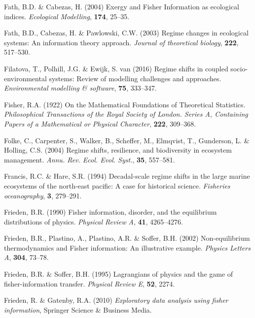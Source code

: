 \documentclass[12pt,twoside,openany]{reedthesis}
\begin{document}
\leavevmode\hypertarget{ref-fath_exergy_2004}{}%
Fath, B.D. \& Cabezas, H. (2004) Exergy and Fisher Information as ecological indices. \emph{Ecological Modelling}, \textbf{174}, 25--35.

\leavevmode\hypertarget{ref-fath_regime_2003}{}%
Fath, B.D., Cabezas, H. \& Pawlowski, C.W. (2003) Regime changes in ecological systems: An information theory approach. \emph{Journal of theoretical biology}, \textbf{222}, 517--530.

\leavevmode\hypertarget{ref-filatova2016regime}{}%
Filatova, T., Polhill, J.G. \& Ewijk, S. van (2016) Regime shifts in coupled socio-environmental systems: Review of modelling challenges and approaches. \emph{Environmental modelling \& software}, \textbf{75}, 333--347.

\leavevmode\hypertarget{ref-fisher_mathematical_1922}{}%
Fisher, R.A. (1922) On the Mathematical Foundations of Theoretical Statistics. \emph{Philosophical Transactions of the Royal Society of London. Series A, Containing Papers of a Mathematical or Physical Character}, \textbf{222}, 309--368.

\leavevmode\hypertarget{ref-folke2004regime}{}%
Folke, C., Carpenter, S., Walker, B., Scheffer, M., Elmqvist, T., Gunderson, L. \& Holling, C.S. (2004) Regime shifts, resilience, and biodiversity in ecosystem management. \emph{Annu. Rev. Ecol. Evol. Syst.}, \textbf{35}, 557--581.

\leavevmode\hypertarget{ref-francis1994decadal}{}%
Francis, R.C. \& Hare, S.R. (1994) Decadal-scale regime shifts in the large marine ecosystems of the north-east pacific: A case for historical science. \emph{Fisheries oceanography}, \textbf{3}, 279--291.

\leavevmode\hypertarget{ref-frieden_fisher_1990}{}%
Frieden, B.R. (1990) Fisher information, disorder, and the equilibrium distributions of physics. \emph{Physical Review A}, \textbf{41}, 4265--4276.

\leavevmode\hypertarget{ref-frieden_non-equilibrium_2002}{}%
Frieden, B.R., Plastino, A., Plastino, A.R. \& Soffer, B.H. (2002) Non-equilibrium thermodynamics and Fisher information: An illustrative example. \emph{Physics Letters A}, \textbf{304}, 73--78.

\leavevmode\hypertarget{ref-frieden1995lagrangians}{}%
Frieden, B.R. \& Soffer, B.H. (1995) Lagrangians of physics and the game of fisher-information transfer. \emph{Physical Review E}, \textbf{52}, 2274.

\leavevmode\hypertarget{ref-frieden_exploratory_2010}{}%
Frieden, R. \& Gatenby, R.A. (2010) \emph{Exploratory data analysis using fisher information}, Springer Science \& Business Media.
\end{document}
